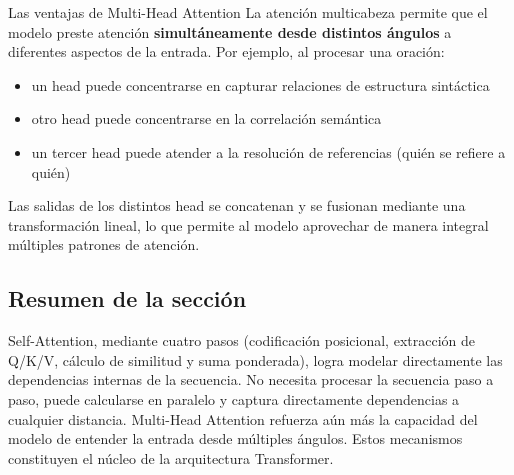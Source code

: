 \begin{importantbox}{Las ventajas de Multi-Head Attention}
La atención multicabeza permite que el modelo preste atención \textbf{simultáneamente desde distintos ángulos} a diferentes aspectos de la entrada. Por ejemplo, al procesar una oración:
\begin{itemize}
    \item un head puede concentrarse en capturar relaciones de estructura sintáctica
    \item otro head puede concentrarse en la correlación semántica
    \item un tercer head puede atender a la resolución de referencias (quién se refiere a quién)
\end{itemize}
Las salidas de los distintos head se concatenan y se fusionan mediante una transformación lineal, lo que permite al modelo aprovechar de manera integral múltiples patrones de atención.
\end{importantbox}

\subsection{Resumen de la sección}

Self-Attention, mediante cuatro pasos (codificación posicional, extracción de Q/K/V, cálculo de similitud y suma ponderada), logra modelar directamente las dependencias internas de la secuencia. No necesita procesar la secuencia paso a paso, puede calcularse en paralelo y captura directamente dependencias a cualquier distancia. Multi-Head Attention refuerza aún más la capacidad del modelo de entender la entrada desde múltiples ángulos. Estos mecanismos constituyen el núcleo de la arquitectura Transformer.

\newpage
